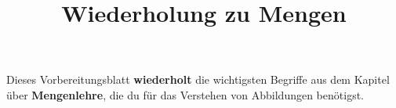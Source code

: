 \documentclass{uebungsblatt}
\title{Wiederholung zu Mengen}
\begin{document}
\maketitle
\begin{contents}
    Dieses Vorbereitungsblatt \textbf{wiederholt} die wichtigsten Begriffe aus dem Kapitel über \textbf{Mengenlehre}, die du für das Verstehen von Abbildungen benötigst.
\end{contents}

\end{document}
